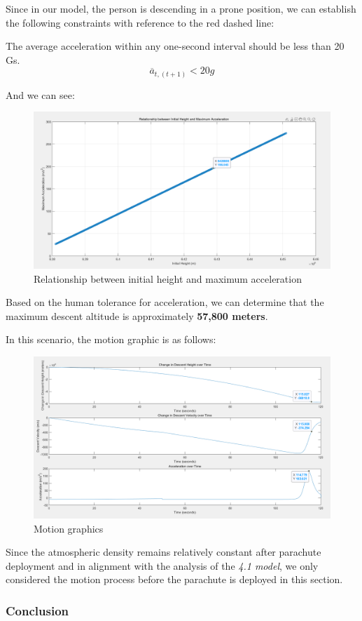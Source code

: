 \documentclass[12pt]{article}
\begin{document}
Since in our model, the person is descending in a prone position, we can establish the 
following constraints with reference to the red dashed line:

The average acceleration within any one-second interval should be less than 20 Gs.
\[\overline{a}_{t, (t+1)} < 20g\]

And we can see:
\begin{figure}[!hbtp]
    \centering 
    \includegraphics[width = 0.8\linewidth]{image/013.png}
    \caption{Relationship between initial height and maximum acceleration}
\end{figure}

Based on the human tolerance for acceleration, we can determine that the maximum descent 
altitude is approximately \textbf{57,800 meters}.

In this scenario, the motion graphic is as follows:
\begin{figure}[!hbtp]
    \centering 
    \includegraphics[width = 0.8\linewidth]{image/014.png}
    \caption{Motion graphics}
\end{figure}

Since the atmospheric density remains relatively constant after 
parachute deployment and in alignment with the analysis of the \textit{4.1 model}, 
we only considered the motion process before the parachute is deployed in this section.

\subsubsection{Conclusion}
\end{document}
